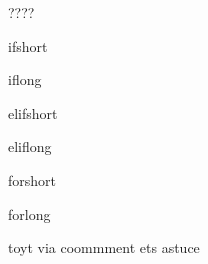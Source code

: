 ????


ifshort


iflong

elifshort

eliflong


forshort

forlong







toyt via coommment ets astuce 


